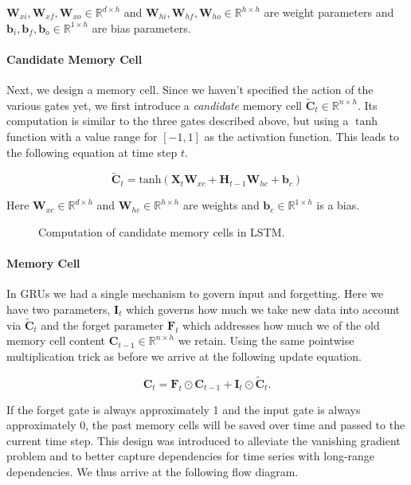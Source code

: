 $\mathbf{W}_{xi}, \mathbf{W}_{xf}, \mathbf{W}_{xo} \in \mathbb{R}^{d \times h}$ and $\mathbf{W}_{hi}, \mathbf{W}_{hf}, \mathbf{W}_{ho} \in \mathbb{R}^{h \times h}$ are weight parameters and $\mathbf{b}_i, \mathbf{b}_f, \mathbf{b}_o \in \mathbb{R}^{1 \times h}$ are bias parameters.

\paragraph{Candidate Memory Cell}

Next, we design a memory cell. Since we haven't specified the action of the various gates yet, we first introduce a \textit{candidate} memory cell $\tilde{\mathbf{C}}_t \in \mathbb{R}^{n \times h}$. Its computation is similar to the three gates described above, but using a $\tanh$ function with a value range for $[-1, 1]$ as the activation function. This leads to the following equation at time step $t$.

$$\tilde{\mathbf{C}}_t = \text{tanh}(\mathbf{X}_t \mathbf{W}_{xc} + \mathbf{H}_{t-1} \mathbf{W}_{hc} + \mathbf{b}_c)$$

Here $\mathbf{W}_{xc} \in \mathbb{R}^{d \times h}$ and $\mathbf{W}_{hc} \in \mathbb{R}^{h \times h}$ are weights and $\mathbf{b}_c \in \mathbb{R}^{1 \times h}$ is a bias.

\begin{figure}[hpt]
    \centering
    
    \caption{Computation of candidate memory cells in LSTM.}
    \label{fig:lstm_1}
\end{figure}


\paragraph{Memory Cell}

In GRUs we had a single mechanism to govern input and forgetting. Here we have two parameters, $\mathbf{I}_t$ which governs how much we take new data into account via $\tilde{\mathbf{C}}_t$ and the forget parameter $\mathbf{F}_t$ which addresses how much we of the old memory cell content $\mathbf{C}_{t-1} \in \mathbb{R}^{n \times h}$ we retain. Using the same pointwise multiplication trick as before we arrive at the following update equation.

$$\mathbf{C}_t = \mathbf{F}_t \odot \mathbf{C}_{t-1} + \mathbf{I}_t \odot \tilde{\mathbf{C}}_t.$$

If the forget gate is always approximately 1 and the input gate is always approximately 0, the past memory cells will be saved over time and passed to the current time step. This design was introduced to alleviate the vanishing gradient problem and to better capture dependencies for time series with long-range dependencies. We thus arrive at the following flow diagram.


